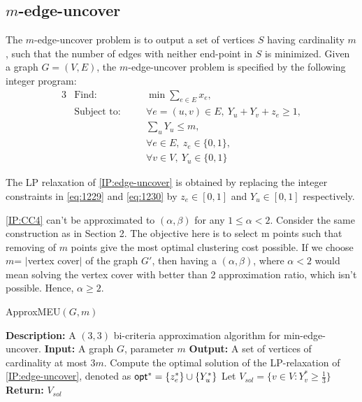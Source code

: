 \subsection{$m$-edge-uncover}
The $m$-edge-uncover problem is to output a set of vertices $S$ having cardinality $m$, such that the number of edges with neither end-point in $S$ is minimized. Given a graph $G = (V,E)$, the $m$-edge-uncover problem is specified by the following integer program:
\begin{alignat}{3} \label{IP:edge-uncover}
		&\text{Find: } && \min \sum_{e \in E} x_e, \tag{IP:edge-uncover}\\
		&\text{Subject to:} \quad && \forall e = (u,v) \in E,\ Y_u + Y_v + z_e \ge 1, \nonumber\\
		& && \sum_{u} Y_u \le m, \nonumber \\
		& && \forall e \in E,\ z_e \in \{ 0,1 \},\label{eq:1229}\\
		& && \forall v \in V,\ Y_u \in \{ 0,1 \} \label{eq:1230}
\end{alignat}

The LP relaxation of \ref{IP:edge-uncover} is obtained by replacing the integer constraints in \eqref{eq:1229} and \eqref{eq:1230} by $z_e \in [ 0,1 ]$ and $Y_u \in [0,1]$ respectively.

{\color{red} \ref{IP:CC4} can't be approximated to $(\alpha, \beta)$ for any $1\leq \alpha<2$. Consider the same construction as in Section 2. The objective here is to select m points such that removing of $m$ points give the most optimal clustering cost possible. If we choose $m$= $|$vertex cover$|$ of the graph $G'$, then having a $(\alpha, \beta)$, where $\alpha<2$ would mean solving the vertex cover with better than 2 approximation ratio, which isn't possible. Hence, $\alpha \geq 2$.}\\

\begin{algorithm}
\caption{{\sf ApproxMEU}$(G,m)$}
\label{alg:min-edge-uncover}
\begin{algorithmic}[1]
\Statex \textbf{Description:} A $(3,3)$ bi-criteria approximation algorithm for {\sf min-edge-uncover}.
\Statex \textbf{Input:} A graph $G$, parameter $m$
\Statex \textbf{Output:} A set of vertices of cardinality at most $3m$.
\State Compute the optimal solution of the LP-relaxation of \ref{IP:edge-uncover}, denoted as $\mathsf{opt}^* = \{ z_e^* \} \cup \{ Y_u^* \}$
\State Let $V_{sol} = \{ v \in V : Y_v^* \ge \frac13 \}$
\Statex \textbf{Return:} $V_{sol}$
\end{algorithmic}
\end{algorithm}

